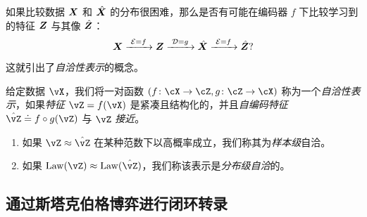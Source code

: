 \documentclass[../../book-main.tex]{subfiles}
\begin{document}
如果比较数据 $\bm{X}$ 和 $\hat {\bm{X}}$ 的分布很困难，那么是否有可能在编码器 $f$ 下比较学习到的特征 $\bm{Z}$ 与其像 $\hat {\bm{Z}}$：
\begin{equation}
 \bm{X}
\xrightarrow{\hspace{1mm} \mathcal{E} = f \hspace{1mm}} \bm{Z}  \xrightarrow{\hspace{1mm} \mathcal{D} = g \hspace{1mm}} \hat{\bm{X}} \xrightarrow{\hspace{1mm} \mathcal{E} = f \hspace{1mm}} \hat {\bm{Z}}?
\label{eqn:closed-autoencoding}
\end{equation}
这就引出了{\em 自洽性表示}的概念。
\begin{definition}[自洽性表示]\label{def:closed_loop}
    给定数据 \(\vX\)，我们将一对函数 \((f \colon \cX \to \cZ, g \colon \cZ \to \cX)\) 称为一个\textit{自洽性表示}，如果\textit{特征} \(\vZ = f(\vX)\) 是紧凑且结构化的，并且\textit{自编码特征} \(\hat{\vZ} \doteq f \circ g(\vZ)\) 与 \(\vZ\) \textit{接近}。
    \begin{enumerate}
        \item 如果 \(\vZ \approx \hat{\vZ}\) 在某种范数下以高概率成立，我们称其为\textit{样本级}自洽。
        \item 如果 \(\Law(\vZ) \approx \Law(\hat{\vZ})\)，我们称该表示是\textit{分布级自洽}的。
    \end{enumerate}
\end{definition}



\subsection{通过斯塔克伯格博弈进行闭环转录}\label{sec:closed-loop-transcription}

\end{document}
